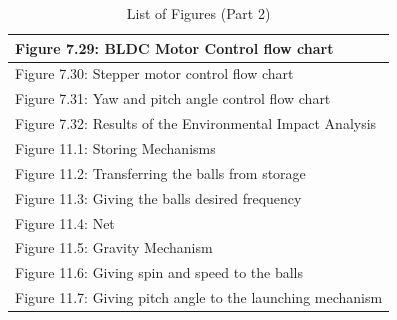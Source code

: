 \documentclass[12pt]{report}
\begin{document}
\begin{table}[h!]
\begin{tabular}{|p{15cm}|}
Figure 7.29: BLDC Motor Control flow chart\\ \hline
Figure 7.30: Stepper motor control flow chart\\ \hline
Figure 7.31: Yaw and pitch angle control flow chart\\ \hline
Figure 7.32: Results of the Environmental Impact Analysis\\ \hline
Figure 11.1: Storing Mechanisms\\ \hline
Figure 11.2: Transferring the balls from storage\\ \hline
Figure 11.3: Giving the balls desired frequency\\ \hline
Figure 11.4: Net\\ \hline
Figure 11.5: Gravity Mechanism\\ \hline
Figure 11.6: Giving spin and speed to the balls\\ \hline
Figure 11.7: Giving pitch angle to the launching mechanism\\ \hline

\end{tabular}
\caption{List of Figures (Part 2)}
\label{tab:list_of_figures_part2}
\end{table}
\end{document}
